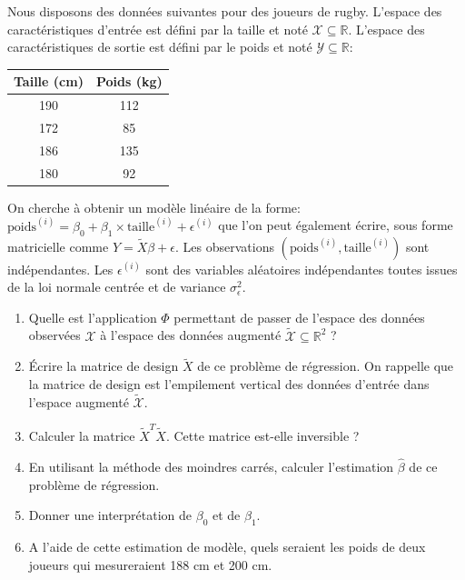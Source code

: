 \documentclass[solutions]{../exercices}
\begin{document}

\begin{exercice}
Nous disposons des données suivantes pour des joueurs de rugby. L'espace des caractéristiques d'entrée est défini par la taille et noté $\mathcal{X} \subseteq \mathbb{R}$. L'espace des caractéristiques de sortie est défini par le poids et noté $\mathcal{Y} \subseteq \mathbb{R}$:

\begin{center}
	\begin{tabular}{|c|c|}
		\hline
		\textbf{Taille} (cm) & \textbf{Poids} (kg) \\ \hline
		190             & 112             \\
		172             & 85              \\
		186             & 135             \\
		180             & 92              \\
		\hline
	\end{tabular}
\end{center}

On cherche à obtenir un modèle linéaire de la forme: $\text{poids}^{(i)} = \beta_0 + \beta_1 \times \text{taille}^{(i)} + \epsilon^{(i)}$ que l'on peut également écrire, sous forme matricielle comme $Y = \tilde{X} \beta + \epsilon$. Les observations $(\text{poids}^{(i)}, \text{taille}^{(i)})$ sont indépendantes. Les $\epsilon^{(i)}$ sont des variables aléatoires indépendantes toutes issues de la loi normale centrée et de variance $\sigma_{\epsilon}^2$.

\begin{enumerate}
	\item Quelle est l'application $\Phi$ permettant de passer de l'espace des données observées $\mathcal{X}$ à l'espace des données augmenté $\tilde{\mathcal{X}} \subseteq \mathbb{R}^2$ ?
	\item Écrire la matrice de design $\tilde{X}$ de ce problème de régression. On rappelle que la matrice de design est l'empilement vertical des données d'entrée dans l'espace augmenté $\tilde{\mathcal{X}}$.
	\item Calculer la matrice $\tilde{X}^T \tilde{X}$. Cette matrice est-elle inversible ?
	\item En utilisant la méthode des moindres carrés, calculer l'estimation $\hat{\beta}$ de ce problème de régression.
	\item Donner une interprétation de $\beta_0$ et de $\beta_1$.
	\item A l'aide de cette estimation de modèle, quels seraient les poids de deux joueurs qui mesureraient 188 cm et 200 cm.
\end{enumerate}
\end{exercice}
\end{document}
